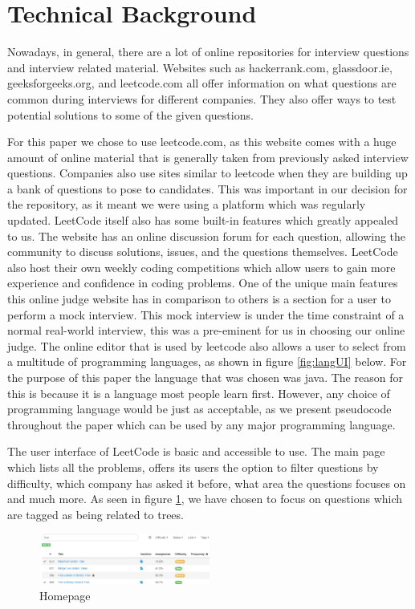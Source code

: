 \documentclass[10pt,twocolumn]{IEEEtran}
\begin{document}
\section{Technical Background}
\par Nowadays, in general, there are a lot of online repositories for interview questions and interview related material. Websites such as hackerrank.com, glassdoor.ie, geeksforgeeks.org, and leetcode.com all offer information on what questions are common during interviews for different companies. They also offer ways to test potential solutions to some of the given questions. 
\par For this paper we chose to use leetcode.com\cite{leet1}, as this website comes with a huge amount of online material that is generally taken from previously asked interview questions. Companies also use sites similar to leetcode when they are building up a bank of questions to pose to candidates. This was important in our decision for the repository, as it meant we were using a platform which was regularly updated. LeetCode itself also has some built-in features which greatly appealed to us. The website has an online discussion forum for each question, allowing the community to discuss solutions, issues, and the questions themselves. LeetCode also host their own weekly coding competitions which allow users to gain more experience and confidence in coding problems. One of the unique main features this online judge website has in comparison to others is a section for a user to perform a mock interview. This mock interview is under the time constraint of a normal real-world interview, this was a pre-eminent for us in choosing our online judge. The online editor that is used by leetcode also allows a user to select from a multitude of programming languages, as shown in figure \ref{fig:langUI} below. For the purpose of this paper the language that was chosen was java. The reason for this is because it is a language most people learn first. However, any choice of programming language would be just as acceptable, as we present pseudocode throughout the paper which can be used by any major programming language.  
\par The user interface of LeetCode is basic and accessible to use. The main page which lists all the problems, offers its users the option to filter questions by difficulty, which company has asked it before, what area the questions focuses on and much more. As seen in figure \ref{fig:homepage}, we have chosen to focus on questions which are tagged as being related to trees. 
\begin{figure}[h]
\includegraphics[width=0.5\textwidth]{homepageUI.png}
\caption{Homepage}
\label{fig:homepage}
\end{figure}
\end{document}
